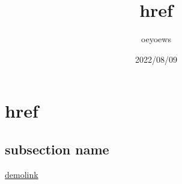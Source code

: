 \documentclass{article}
\title{href}
\author{oeyoews}
\date{2022/08/09}
\begin{document}
\maketitle


\section{href}

\subsection{subsection name}%

\href{https://oeyoew.top}{demolink}
\end{document}
